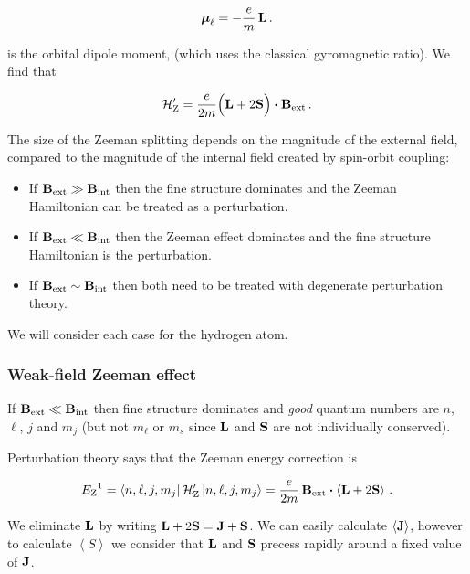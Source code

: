 \documentclass[12pt, titlepage]{article}
\newcommand{\exv}[1]{\left\langle #1 \right\rangle}
\begin{document}
\begin{equation}
	\vb*{\mu}_\ell = -\frac{e}{m}\,\vb{L} \,.
\end{equation}

is the orbital dipole moment, (which uses the classical gyromagnetic ratio). We find that

\begin{equation}
	\mathcal{H}_{\text{Z}}^\prime = \frac{e}{2m}\Bigl(\vb{L} + 2\vb{S}\Bigr)\vdot\vb{B}_\text{ext} \,.
\end{equation}

The size of the Zeeman splitting depends on the magnitude of the external field, compared to the magnitude of the internal field created by spin-orbit coupling:

\begin{itemize}
	\item If $\vb{B}_\text{ext} \gg \vb{B}_\text{int}$ then the fine structure dominates and the Zeeman Hamiltonian can be treated as a perturbation.
	\item If $\vb{B}_\text{ext} \ll \vb{B}_\text{int}$ then the Zeeman effect dominates and the fine structure Hamiltonian is the perturbation.
	\item If $\vb{B}_\text{ext} \sim \vb{B}_\text{int}$ then both need to be treated with degenerate perturbation theory.
\end{itemize}

We will consider each case for the hydrogen atom.

\subsubsection{Weak-field Zeeman effect}
If $\vb{B}_\text{ext} \ll \vb{B}_\text{int}$ then fine structure dominates and \textit{good} quantum numbers are $n$, $\ell$, $j$ and $m_j$ (but not $m_\ell$ or $m_s$ since $\vb{L}$ and $\vb{S}$ are not individually conserved).

Perturbation theory says that the Zeeman energy correction is

\begin{equation}
	{E_\text{Z}}^1 = \bra{n,\ell,j,m_j} \mathcal{H}_\text{Z}^\prime \ket{{n,\ell,j,m_j}} = \frac{e}{2m}\,\vb{B}_\text{ext}\vdot\exv{\vb{L} + 2\vb{S}} \,.
\end{equation}

We eliminate $\vb{L}$ by writing $\vb{L} + 2\vb{S} = \vb{J} + \vb{S}$. We can easily calculate $\exv{\vb{J}}$, however to calculate $\exv{S}$ we consider that $\vb{L}$ and $\vb{S}$ precess rapidly around a fixed value of $\vb{J}$. 
\end{document}
